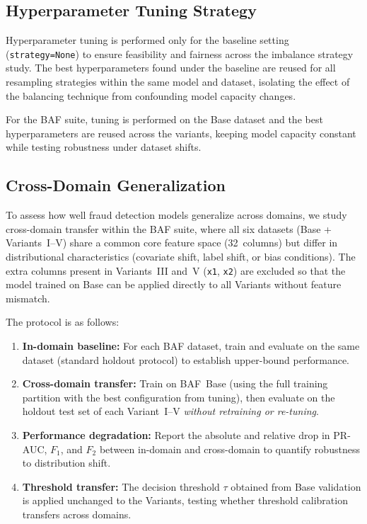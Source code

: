 \subsection{Hyperparameter Tuning Strategy}
\label{sec:tuning}

Hyperparameter tuning is performed only for the baseline setting (\texttt{strategy=None}) to ensure feasibility and fairness across the imbalance strategy study. The best hyperparameters found under the baseline are reused for all resampling strategies within the same model and dataset, isolating the effect of the balancing technique from confounding model capacity changes.

For the BAF suite, tuning is performed on the Base dataset and the best hyperparameters are reused across the variants, keeping model capacity constant while testing robustness under dataset shifts.

\subsection{Cross-Domain Generalization}
\label{sec:cross_domain}

To assess how well fraud detection models generalize across domains, we study cross-domain transfer within the BAF suite, where all six datasets (Base + Variants~I--V) share a common core feature space (32~columns) but differ in distributional characteristics (covariate shift, label shift, or bias conditions). The extra columns present in Variants~III and~V (\texttt{x1}, \texttt{x2}) are excluded so that the model trained on Base can be applied directly to all Variants without feature mismatch.

The protocol is as follows:
\begin{enumerate}
  \item \textbf{In-domain baseline:} For each BAF dataset, train and evaluate on the same dataset (standard holdout protocol) to establish upper-bound performance.
  \item \textbf{Cross-domain transfer:} Train on BAF~Base (using the full training partition with the best configuration from tuning), then evaluate on the holdout test set of each Variant~I--V \emph{without retraining or re-tuning}.
  \item \textbf{Performance degradation:} Report the absolute and relative drop in PR-AUC, $F_1$, and $F_2$ between in-domain and cross-domain to quantify robustness to distribution shift.
  \item \textbf{Threshold transfer:} The decision threshold $\tau$ obtained from Base validation is applied unchanged to the Variants, testing whether threshold calibration transfers across domains.
\end{enumerate}

